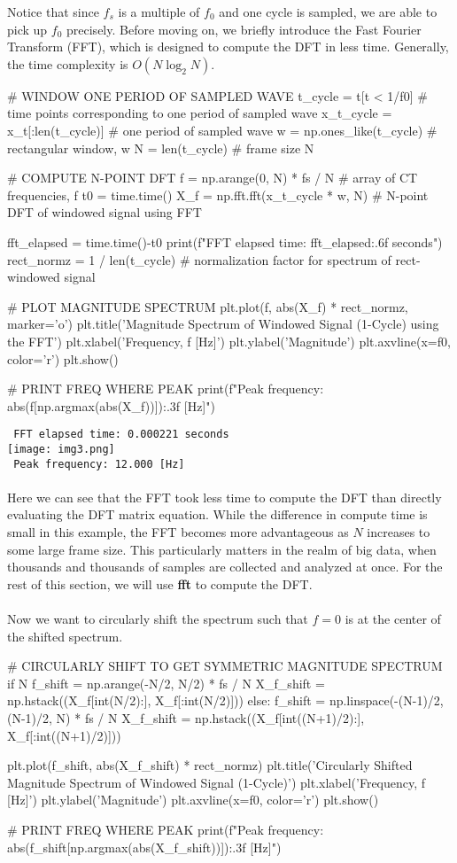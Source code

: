 \documentclass{report}
\begin{document}
Notice that since $f_s$ is a multiple of $f_0$ and one cycle is sampled, we are able to pick up $f_0$ precisely. 
Before moving on, we briefly introduce the Fast Fourier Transform (FFT), which is designed to compute the DFT in less time. 
Generally, the time complexity is $O(N\log_2 N)$.
\begin{python}
# WINDOW ONE PERIOD OF SAMPLED WAVE
t_cycle = t[t < 1/f0]                  # time points corresponding to one period of sampled wave
x_t_cycle = x_t[:len(t_cycle)]         # one period of sampled wave
w = np.ones_like(t_cycle)              # rectangular window, w
N = len(t_cycle)                       # frame size N

# COMPUTE N-POINT DFT 
f = np.arange(0, N) * fs / N           # array of CT frequencies, f
t0 = time.time()
X_f = np.fft.fft(x_t_cycle * w, N)     # N-point DFT of windowed signal using FFT

fft_elapsed = time.time()-t0
print(f"FFT elapsed time: {fft_elapsed:.6f} seconds")
rect_normz = 1 / len(t_cycle)          # normalization factor for spectrum of rect-windowed signal

# PLOT MAGNITUDE SPECTRUM
plt.plot(f, abs(X_f) * rect_normz, marker='o')
plt.title('Magnitude Spectrum of Windowed Signal (1-Cycle) \n using the FFT')
plt.xlabel('Frequency, f [Hz]')
plt.ylabel('Magnitude')
plt.axvline(x=f0, color='r')
plt.show()

# PRINT FREQ WHERE PEAK
print(f"Peak frequency: {abs(f[np.argmax(abs(X_f))]):.3f} [Hz]")
\end{python}
\texttt{ FFT elapsed time: 0.000221 seconds} \\ 
\texttt{[image: img3.png]} \\ 
\texttt{ Peak frequency: 12.000 [Hz]}
\\ \\
Here we can see that the FFT took less time to compute the DFT than directly evaluating the DFT matrix equation. While the difference in compute time is 
small in this example, the FFT becomes more advantageous as $N$ increases to some large frame size. This particularly matters in the realm of big data, when 
thousands and thousands of samples are collected and analyzed at once. For the rest of this section, we will use \textbf{fft} to compute the DFT.
\\ \\
Now we want to circularly shift the spectrum such that $f=0$ is at the center of the shifted spectrum.
\begin{python}
# CIRCULARLY SHIFT TO GET SYMMETRIC MAGNITUDE SPECTRUM
if N %
    f_shift = np.arange(-N/2, N/2) * fs / N
    X_f_shift = np.hstack((X_f[int(N/2):], X_f[:int(N/2)]))
else:
    f_shift = np.linspace(-(N-1)/2, (N-1)/2, N) * fs / N
    X_f_shift = np.hstack((X_f[int((N+1)/2):], X_f[:int((N+1)/2)]))
    
plt.plot(f_shift, abs(X_f_shift) * rect_normz)
plt.title('Circularly Shifted Magnitude Spectrum of \n Windowed Signal (1-Cycle)')
plt.xlabel('Frequency, f [Hz]')
plt.ylabel('Magnitude')
plt.axvline(x=f0, color='r')
plt.show()

# PRINT FREQ WHERE PEAK
print(f"Peak frequency: {abs(f_shift[np.argmax(abs(X_f_shift))]):.3f} [Hz]")
\end{python}
\end{document}
